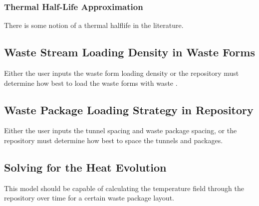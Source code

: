 \documentclass[letterpaper]{article}
\begin{document}
\subsubsection{Thermal Half-Life Approximation}

There is some notion of a thermal halflife in the literature. 



\subsection{Waste Stream Loading Density in Waste Forms}

Either the user inputs the waste form loading density or the repository must 
determine how best to load the waste forms with waste .

\subsection{Waste Package Loading Strategy in Repository}

Either the user inputs the tunnel spacing and waste package spacing, or the 
repository must determine how best to space the tunnels and packages.

\subsection{Solving for the Heat Evolution}

This model should be capable of calculating the temperature field through the 
repository over time for a certain waste package layout. 
\end{document}
